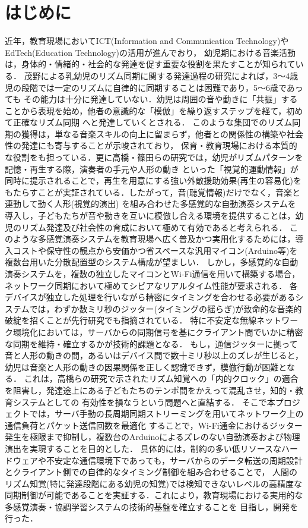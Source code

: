 \section{はじめに}
近年，教育現場においてICT(Information and Communication Technology)やEdTech(Education Technology)の活用が進んでおり，
幼児期における音楽活動は，身体的・情緒的・社会的な発達を促す重要な役割を果たすことが知られている．
茂野\cite{shigeno2020}による乳幼児のリズム同期に関する発達過程の研究によれば，3〜4歳児の段階では一定のリズムに自律的に同期することは困難であり，5〜6歳であっても
その能力は十分に発達していない．幼児は周囲の音や動きに「共振」することから表現を始め，他者の意識的な「模倣」を繰り返すステップを経て，初めて正確なリズム同期
へと発達していくとされる\cite{shigeno2020}．
このような集団でのリズム同期の獲得は，単なる音楽スキルの向上に留まらず，他者との関係性の構築や社会性の発達にも寄与することが示唆されており，
保育・教育現場における本質的な役割をも担っている．更に高橋・篠田\cite{takasino}らの研究では，幼児がリズムパターンを記憶・再生する際，演奏者の手元や人形の動き
といった「視覚的運動情報」が同時に提示されることで，再生を用意にする強い外敵援助効果(再生の容易化)をもたらすことが実証されている．したがって，音(聴覚情報)だけでなく，音楽と連動して動く人形(視覚的演出)
を組み合わせた多感覚的な自動演奏システムを導入し，子どもたちが音や動きを互いに模倣し合える環境を提供することは，幼児のリズム発達及び社会性の育成において極めて有効であると考えられる．
このような多感覚演奏システムを教育現場へ広く普及かつ実用化するためには，導入コストや保守性の観点から安価かつ省スペースな汎用マイコン(Arduino等)を複数台用いた分散配置型のシステム構成が望ましい．
しかし，多感覚的な自動演奏システムを，複数の独立したマイコンとWi-Fi通信を用いて構築する場合，ネットワーク同期において極めてシビアなリアルタイム性能が要求される．
各デバイスが独立した処理を行いながら精密にタイミングを合わせる必要があるシステムでは，わずか数ミリ秒のジッター(タイミングの揺らぎ)が致命的な音楽的破綻を招くことが先行研究でも指摘されている\cite{Lazzaro}\cite{Rottondi}．
特に不安定な無線ネットワーク環境化においては，サーバからの同期信号を基にクライアント間でいかに精密な同期を維持・確立するかが技術的課題となる．
もし，通信ジッターに拠って音と人形の動きの間，あるいはデバイス間で数十ミリ秒以上のズレが生じると，幼児は音楽と人形の動きの因果関係を正しく認識できず，模倣行動が困難となる．
これは，高橋ら\cite{takasino}の研究で示されたリズム知覚への「内的クロック」の適合を阻害し，発達途上にある子どもたちのテンポ間をかえって混乱させ，知的・教育システムとしての
有効性を損なうという問題へと直結する．
そこで本プロジェクトでは，サーバ手動の長周期同期ストリーミングを用いてネットワーク上の通信負荷とパケット送信回数を最適化
することで，Wi-Fi通金におけるジッター発生を極限まで抑制し，複数台のArduinoによるズレのない自動演奏および物理演出を実現することを目的とした．
具体的には，制約の多い低リソースなハードウェアや不安定な通信環境下であっても，サーバからのデータ転送の周期設計とクライアント側での自律的なタイミング制御を組み合わせることで，
人間のリズム知覚(特に発達段階にある幼児の知覚)では検知できないレベルの高精度な同期制御が可能であることを実証する．これにより，教育現場における実用的な多感覚演奏・協調学習システムの技術的基盤を確立することを
目指し，開発を行った．

